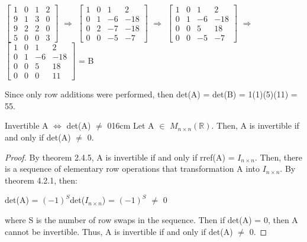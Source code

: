     \begin{tbox}
        \scriptsize
        $\begin{bmatrix}
            1 & 0 & 1 & 2 \\
            9 & 1 & 3 & 0 \\
            9 & 2 & 2 & 0 \\
            5 & 0 & 0 & 3
        \end{bmatrix}$
        $\Rightarrow$
        $\begin{bmatrix}
            1 & 0 & 1 & 2 \\
            0 & 1 & -6 & -18 \\
            0 & 2 & -7 & -18 \\
            0 & 0 & -5 & -7
        \end{bmatrix}$
        $\Rightarrow$
        $\begin{bmatrix}
            1 & 0 & 1 & 2 \\
            0 & 1 & -6 & -18 \\
            0 & 0 & 5 & 18 \\
            0 & 0 & -5 & -7
        \end{bmatrix}$
        $\Rightarrow$
        $\begin{bmatrix}
            1 & 0 & 1 & 2 \\
            0 & 1 & -6 & -18 \\
            0 & 0 & 5 & 18 \\
            0 & 0 & 0 & 11
        \end{bmatrix}$
        \normalsize
        = B

        Since only row additions were performed,
        then det(A) = det(B) = 1(1)(5)(11) = 55.
    \end{tbox}

    \vspace{0.5cm}



    \begin{wtheorem}{Invertible A $\Leftrightarrow$ det(A) $\not =$ 0}{16cm}
        Let A $\in$ $M_{n \times n}(\mathbb{R})$.
        Then, A is invertible if and only if det(A) $\not =$ 0.
    \end{wtheorem}

    \begin{proof}
        By {\color{red} theorem 2.4.5}, A is invertible if and only if
        rref(A) = $I_{n \times n}$.
        Then, there is a sequence of elementary row operations that
        transformation A into $I_{n \times n}$.
        By {\color{red} theorem 4.2.1}, then:

        \hspace{0.5cm}
        det(A) = $(-1)^S$det($I_{n \times n}$) = $(-1)^S$ $\not =$ 0

        where S is the number of row swaps in the sequence.
        Then if det(A) = 0, then A cannot be invertible.
        Thus, A is invertible if and only if det(A) $\not =$ 0.
    \end{proof}


